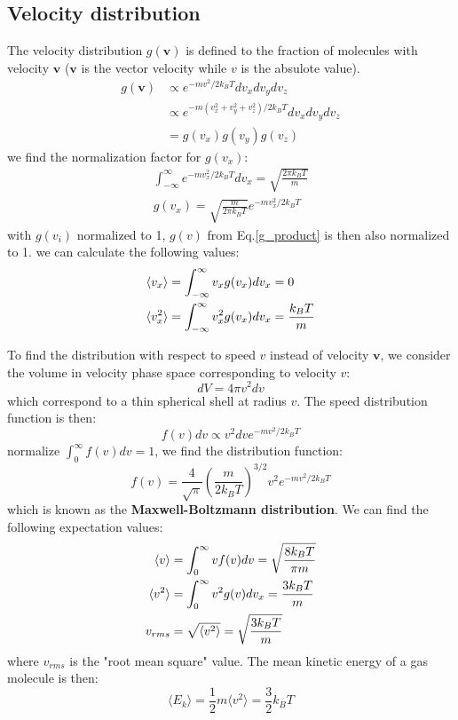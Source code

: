 \documentclass{article}
\begin{document}
\subsection{Velocity distribution}
The velocity distribution $g(\mathbf{v})$ is defined to the fraction of molecules with 
velocity $\mathbf{v}$ 
($\mathbf{v}$ is the vector velocity while $v$ is the absulote value). 
\begin{align}
    g(\mathbf{v}) &\propto e^{-mv^2/2k_BT} dv_xdv_ydv_z \\
    &\propto e^{-m(v_x^2 + v_y^2 + v_z^2)/2k_BT} dv_xdv_ydv_z \\
    &= g(v_x)g(v_y)g(v_z) \label{g_product}
\end{align} 
we find the normalization factor for $g(v_x)$:
\begin{gather}
    \int_{-\infty}^{\infty} e^{-mv_x^2/2k_BT} dv_x = \sqrt{\frac{2\pi k_BT}{m}} \\
    g(v_x) = \sqrt{\frac{m}{2\pi k_BT}} e^{-mv_x^2/2k_BT}
\end{gather}
with $g(v_i)$ normalized to 1, $g(v)$ from Eq.\ref{g_product} is then also normalized to 1.
we can calculate the following values:
\begin{align}
    \langle v_x \rangle &= \int_{-\infty}^{\infty} v_x g(v_x) dv_x = 0 \notag \\
    \langle v_x^2 \rangle &= \int_{-\infty}^{\infty} v_x^2 g(v_x) dv_x = \frac{k_BT}{m} \notag 
\end{align}

To find the distribution with respect to speed $v$ instead of velocity $\mathbf{v}$, we 
consider the volume in velocity phase space corresponding to velocity $v$:
\begin{equation}
    dV = 4\pi v^2 dv
\end{equation}
which correspond to a thin spherical shell at radius $v$. The speed distribution function is then:
\begin{equation}
    f(v) dv \propto v^2 dv e^{-mv^2/2k_BT}
\end{equation}
normalize $\int_0^{\infty}f(v)dv = 1$, we find the distribution function:
\begin{equation}
    f(v) = \frac{4}{\sqrt{\pi}}\left(\frac{m}{2k_BT}\right)^{3/2} v^2 e^{-mv^2/2k_BT}
\end{equation}
which is known as the \textbf{Maxwell-Boltzmann distribution}. 
We can find the following expectation values:
\begin{align}
    \langle v \rangle &= \int_{0}^{\infty} v f(v) dv = \sqrt{\frac{8k_BT}{\pi m}} \notag \\
    \langle v^2 \rangle &= \int_{0}^{\infty} v^2 g(v) dv_x = \frac{3k_BT}{m} \notag  \\
    v_{rms} &= \sqrt{\langle v^2 \rangle} = \sqrt{\frac{3k_BT}{m}}
\end{align}
where $v_{rms}$ is the "root mean square" value. 
The mean kinetic energy of a gas molecule is then:
\begin{equation}
    \langle E_k \rangle = \frac{1}{2}m \langle v^2 \rangle = \frac{3}{2}k_BT
\end{equation}
\end{document}
